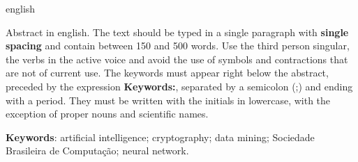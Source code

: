 \begin{resumo}[Abstract]
\begin{otherlanguage*}{english}
\begin{SingleSpace}
Abstract in english. The text should be typed in a single paragraph with \textbf{single spacing} and contain between 150 and 500 words. Use the third person singular, the verbs in the active voice and avoid the use of symbols and contractions that are not of current use. The keywords must appear right below the abstract, preceded by the expression \textbf{Keywords:}, separated by a semicolon (;) and ending with a period. They must be written with the initials in lowercase, with the exception of proper nouns and scientific names.
\end{SingleSpace}


\vspace{\onelineskip}
   \textbf{Keywords}: artificial intelligence; cryptography; data mining; Sociedade Brasileira de Computação; neural network.
   
 \end{otherlanguage*}
\end{resumo}




  
